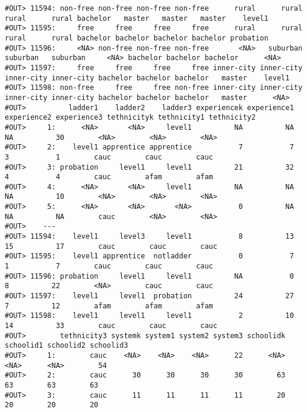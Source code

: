 \documentclass[]{book}
\begin{document}
\begin{verbatim}
#OUT> 11594: non-free non-free non-free non-free      rural      rural      rural      rural bachelor   master   master   master    level1
#OUT> 11595:     free     free     free     free      rural      rural      rural      rural bachelor bachelor bachelor bachelor probation
#OUT> 11596:     <NA> non-free non-free non-free       <NA>   suburban   suburban   suburban     <NA> bachelor bachelor bachelor      <NA>
#OUT> 11597:     free     free     free     free inner-city inner-city inner-city inner-city bachelor bachelor bachelor   master    level1
#OUT> 11598: non-free     free     free non-free inner-city inner-city inner-city inner-city bachelor bachelor bachelor   master      <NA>
#OUT>          ladder1    ladder2    ladder3 experiencek experience1 experience2 experience3 tethnicityk tethnicity1 tethnicity2
#OUT>     1:      <NA>       <NA>     level1          NA          NA          NA          30        <NA>        <NA>        <NA>
#OUT>     2:    level1 apprentice apprentice           7           7           3           1        cauc        cauc        cauc
#OUT>     3: probation     level1     level1          21          32           4           4        cauc        afam        afam
#OUT>     4:      <NA>       <NA>     level1          NA          NA          NA          10        <NA>        <NA>        <NA>
#OUT>     5:      <NA>       <NA>       <NA>           0          NA          NA          NA        cauc        <NA>        <NA>
#OUT>    ---                                                                                                                    
#OUT> 11594:    level1     level3     level1           8          13          15          17        cauc        cauc        cauc
#OUT> 11595:    level1 apprentice  notladder           0           7           1           7        cauc        cauc        cauc
#OUT> 11596: probation     level1     level1          NA           0           8          22        <NA>        cauc        cauc
#OUT> 11597:    level1     level1  probation          24          27           7          12        afam        afam        afam
#OUT> 11598:    level1     level1     level1           2          10          14          33        cauc        cauc        cauc
#OUT>        tethnicity3 systemk system1 system2 system3 schoolidk schoolid1 schoolid2 schoolid3
#OUT>     1:        cauc    <NA>    <NA>    <NA>      22      <NA>      <NA>      <NA>        54
#OUT>     2:        cauc      30      30      30      30        63        63        63        63
#OUT>     3:        cauc      11      11      11      11        20        20        20        20

\end{verbatim}
\end{document}
